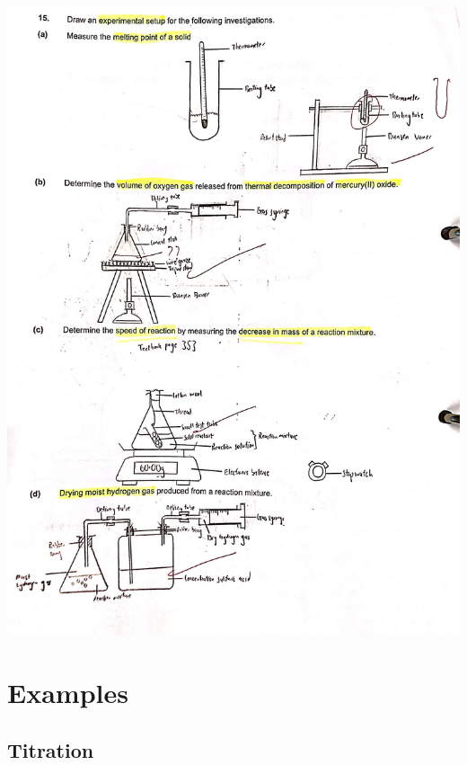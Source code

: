 \documentclass[oneside]{book}
\begin{document}
{\begin{center}
\includegraphics[width=\textwidth,height=\textheight,keepaspectratio]{images/ED948B7C-1CFB-4480-AC9D-D799496A95CE.jpeg}
\end{center}}
\chapter{Examples}
\section{Titration}
\end{document}
